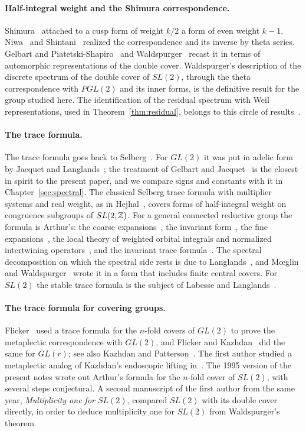 \paragraph{Half-integral weight and the Shimura correspondence.}
Shimura~\cite{Sh73} attached to a cusp form of weight $k/2$ a form of even
weight $k-1$. Niwa~\cite{Ni75} and Shintani~\cite{Sh75} realized the
correspondence and its inverse by theta series. Gelbart and
Piatetski-Shapiro~\cite{GPS80,GPS83} and Waldspurger~\cite{Wa80,Wa81,Wa91}
recast it in terms of automorphic representations of the double cover.
Waldspurger's description of the discrete spectrum of the double cover of
$SL(2)$, through the theta correspondence with $PGL(2)$ and its inner
forms, is the definitive result for the group studied here. The
identification of the residual spectrum with Weil representations, used
in Theorem~\ref{thm:residual}, belongs to this circle of
results~\cite{Ge76,GPS80,Wa80}.

\paragraph{The trace formula.} The trace formula goes back to
Selberg~\cite{Se56}. For $GL(2)$ it was put in adelic form by Jacquet and
Langlands~\cite{JL70}; the treatment of Gelbart and Jacquet~\cite{GJ79} is the
closest in spirit to the present paper, and we compare signs and
constants with it in Chapter~\ref{sec:spectral}. The classical Selberg
trace formula with multiplier systems and real weight, as in
Hejhal~\cite{He83}, covers forms of half-integral weight on congruence
subgroups of $SL(2,\mathbb{Z})$. For a general connected reductive group the
formula is Arthur's: the coarse expansions~\cite{Ar78,Ar80}, the invariant
form~\cite{Ar81}, the fine expansions~\cite{Ar86,Ar82}, the local theory of
weighted orbital integrals and normalized intertwining
operators~\cite{Ar88a,Ar88b,Ar89}, and the invariant trace
formula~\cite{Ar88c}. The spectral decomposition on which the spectral side
rests is due to Langlands~\cite{La76}, and M\oe glin and
Waldspurger~\cite{MW95} wrote it in a form that includes finite central
covers. For $SL(2)$ the stable trace formula is the subject of Labesse
and Langlands~\cite{LL79}.

\paragraph{The trace formula for covering groups.} Flicker~\cite{Fl80} used
a trace formula for the $n$-fold covers of $GL(2)$ to prove the
metaplectic correspondence with $GL(2)$, and Flicker and
Kazhdan~\cite{FK86} did the same for $GL(r)$; see also Kazhdan and Patterson~\cite{KP86}.
The first author studied a metaplectic analog of Kazhdan's
endoscopic lifting in~\cite{Jo88}. The 1995 version of the present notes
wrote out Arthur's formula for the $n$-fold cover of $SL(2)$, with
several steps conjectural. A second manuscript of the first author from
the same year, \emph{Multiplicity one for $SL(2)$}, compared $SL(2)$ with
its double cover directly, in order to deduce multiplicity one for
$SL(2)$ from Waldspurger's theorem.

